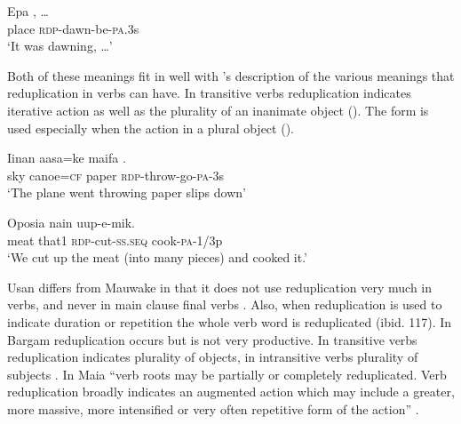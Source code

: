 \ea%
\label{ex:x692}
\gll Epa , {\dots} \\
place \textsc{rdp}-dawn-be-\textsc{pa}.3s\\
\glt`It was dawning, {\dots}'
\z

Both of these meanings fit in well with 's description of the various meanings that reduplication in verbs can have. In transitive verbs reduplication indicates iterative action as well as the plurality of an inanimate object (). The form is used especially when the action  in a plural object ().

\ea%
\label{ex:x219}
\gll Iinan aasa=ke maifa . \\
sky canoe=\textsc{cf} paper \textsc{rdp}-throw-go-\textsc{pa}-3s \\
\glt`The plane went throwing paper slips down' 
\z

\ea%
\label{ex:x220}
\gll Oposia nain  uup-e-mik. \\
meat that1 \textsc{rdp}-cut-\textsc{ss}.\textsc{seq} cook-\textsc{pa}-1/3p \\
\glt`We cut up the meat (into many pieces) and cooked it.'
\z

Usan differs from Mauwake in that it does not use reduplication very much in verbs, and never in main clause final verbs \citep[116]{Reesink1987}. Also, when reduplication is used to indicate duration or repetition the whole verb word is reduplicated (ibid. 117). In Bargam reduplication occurs but is not very productive. In transitive verbs reduplication indicates plurality of objects, in intransitive verbs plurality of subjects \citep[19]{Hepner2002}. In Maia ``{verb roots may be partially or completely reduplicated. Verb reduplication broadly indicates an augmented action which may include a greater, more massive, more intensified or very often repetitive form of the action}'' \citep[50]{Hardin2002}.

